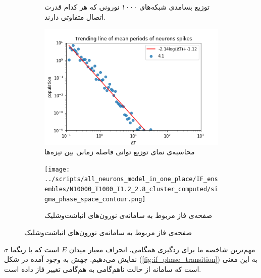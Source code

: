 \begin{figure}
\begin{subfigure}[b]{0.5\textwidth}
		\caption{توزیع بسامدی شبکه‌های ۱۰۰۰ نورونی که هر کدام قدرت اتصال متفاوتی دارند. }
		\label{fig:if_isi}
	\end{subfigure}
	\hfill
	\begin{subfigure}[b]{0.5\textwidth}
		\centering
		\includegraphics[width = \textwidth]{../papers_studies/figs/IF/mean_spiking_persiods_with_trending_line.png}
		\caption{محاسبه‌ی نمای توزیع توانی فاصله زمانی بین تیزه‌ها}
		\label{fig:if_isi_trending_line}
	\end{subfigure}
	\hfill
	\begin{subfigure}[b]{0.5\textwidth}
		\centering
		\texttt{[image: ../scripts/all\_neurons\_model\_in\_one\_place/IF\_ensembles/N10000\_T1000\_I1.2\_2.8\_cluster\_computed/sigma\_phase\_space\_contour.png]}
		\caption{صفحه‌ی فاز مربوط به سامانه‌ی نورون‌های انباشت‌وشلیک}
		\label{fig:if_g_d_phase_space}
	\end{subfigure}
\end{figure}

مهم‌ترین شاخصه ما برای ردگیری همگامی، انحراف معیار میدان $E$ است که با زیگما $\sigma$ نمایش می‌دهیم. جهش به وجود آمده در شکل‌ (\ref{fig:if_phase_transition}) به این معنی است که سامانه از حالت ناهم‌گامی به هم‌گامی تغییر فاز داده است. 



